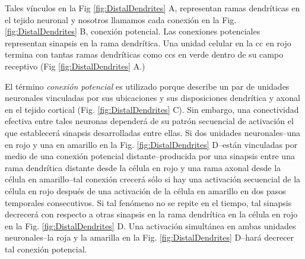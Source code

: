 Tales vínculos en la Fig \ref{fig:DistalDendrites} A, representan ramas dendríticas en el tejido neuronal y nosotros llamamos cada conexión en la Fig. \ref{fig:DistalDendrites} B, conexión potencial. Las conexiones potenciales representan sinapsis en la rama dendrítica. Una unidad celular en la \gls{cc} en rojo termina con tantas ramas dendríticas como \glspl{cc} en verde dentro de su campo receptivo (Fig \ref{fig:DistalDendrites} A.)


El término \emph{conexión potencial} es utilizado porque describe un par de unidades neuronales vinculadas por sus ubicaciones y sus disposiciones dendrítica y axonal en el tejido cortical (Fig. \ref{fig:DistalDendrites} C). Sin embargo, una conectividad efectiva entre tales neuronas dependerá de  su patrón secuencial de activación el que establecerá sinapsis desarrolladas entre ellas. Si dos unidades neuronales--una en rojo y una en amarillo en la Fig. \ref{fig:DistalDendrites} D--están vinculadas por medio de una conexión potencial distante--producida por una sinapsis entre una rama dendrítica distante desde la célula en rojo y una rama axonal desde la célula en amarillo--tal conexión crecerá sólo si hay una activación secuencial de la célula en rojo después de una activación de la célula en amarillo en dos pasos temporales consecutivos. Si tal fenómeno no se repite en el tiempo, tal sinapsis decrecerá con respecto a otras sinapsis en la rama dendrítica en la célula en rojo en la Fig. \ref{fig:DistalDendrites} D. Una activación simultánea en ambas unidades neuronales--la roja y la amarilla en la Fig. \ref{fig:DistalDendrites} D--hará decrecer tal conexión potencial.


